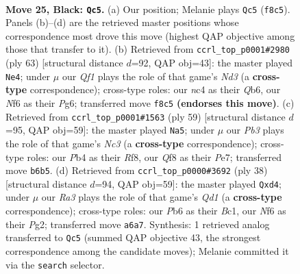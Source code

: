 \documentclass[11pt]{article}
\begin{document}
\clearpage

\begin{figure}[p]\centering
\begin{subfigure}{0.46\textwidth}\centering
\resizebox{\linewidth}{!}{%
\newchessgame
\chessboard[
  setfen={2b2q2/5pkp/rp3np1/8/PpN5/1P4PN/5PBP/R3R1K1 b - - 1 25},
  showmover=false,
  pgfstyle=straightmove, color=movearrow, markmove={f8-c5}
]}
\caption{}
\end{subfigure}\hfill
\begin{subfigure}{0.46\textwidth}\centering
\resizebox{\linewidth}{!}{%
\newchessgame
\chessboard[
  setfen={8/1p3pkp/1q1n2p1/3p4/p6P/P1P2N2/1P1R1PP1/3R2K1 b - - 0 32},
  showmover=false,
  pgfstyle=straightmove, color=movearrow, markmove={d6-e4}
]}
\caption{}
\end{subfigure}
\\[4pt]
\begin{subfigure}{0.46\textwidth}\centering
\resizebox{\linewidth}{!}{%
\newchessgame
\chessboard[
  setfen={5r2/4pp2/r1n2kp1/2p2b1p/P6P/6P1/2N1PPB1/R1R3K1 b - - 0 30},
  showmover=false,
  pgfstyle=straightmove, color=movearrow, markmove={c6-a5}
]}
\caption{}
\end{subfigure}\hfill
\begin{subfigure}{0.46\textwidth}\centering
\resizebox{\linewidth}{!}{%
\newchessgame
\chessboard[
  setfen={q3r1k1/2p1b1pp/5p2/1p1n4/3p3N/7P/1PP2PP1/2BQR1K1 w - - 0 20},
  showmover=false,
  pgfstyle=straightmove, color=movearrow, markmove={d1-d4}
]}
\caption{}
\end{subfigure}
\caption{\textbf{Move 25, Black: \texttt{Qc5}.} (a) Our position; Melanie plays \texttt{Qc5} (\texttt{f8c5}). Panels (b)--(d) are the retrieved master positions whose correspondence most drove this move (highest QAP objective among those that transfer to it). (b) Retrieved from \texttt{ccrl\_top\_p0001\#2980} (ply 63) [structural distance $d$=92, QAP obj=43]: the master played \texttt{Ne4}; under $\mu$ our \emph{Qf1} plays the role of that game's \emph{Nd3} (a \textbf{cross-type} correspondence); cross-type roles: our \emph{n}c4 as their \emph{Q}b6, our \emph{N}f6 as their \emph{P}g6; transferred move \texttt{f8c5} \textbf{(endorses this move)}. (c) Retrieved from \texttt{ccrl\_top\_p0001\#1563} (ply 59) [structural distance $d$=95, QAP obj=59]: the master played \texttt{Na5}; under $\mu$ our \emph{Pb3} plays the role of that game's \emph{Nc3} (a \textbf{cross-type} correspondence); cross-type roles: our \emph{P}b4 as their \emph{R}f8, our \emph{Q}f8 as their \emph{P}e7; transferred move \texttt{b6b5}. (d) Retrieved from \texttt{ccrl\_top\_p0000\#3692} (ply 38) [structural distance $d$=94, QAP obj=59]: the master played \texttt{Qxd4}; under $\mu$ our \emph{Ra3} plays the role of that game's \emph{Qd1} (a \textbf{cross-type} correspondence); cross-type roles: our \emph{P}b6 as their \emph{B}c1, our \emph{N}f6 as their \emph{P}g2; transferred move \texttt{a6a7}. Synthesis: 1 retrieved analog transferred to \texttt{Qc5} (summed QAP objective 43, the strongest correspondence among the candidate moves); Melanie committed it via the \texttt{search} selector.}
\label{fig:thought-m49}
\end{figure}
\end{document}
